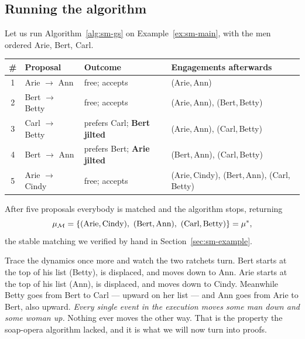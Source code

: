 \subsection{Running the algorithm}\label{sec:sm-trace}

Let us run Algorithm~\ref{alg:sm-gs} on Example~\ref{ex:sm-main}, with the men
ordered Arie, Bert, Carl.

\begin{center}
\small
\begin{tabular}{@{}clll@{}}
\toprule
\# & Proposal & Outcome & Engagements afterwards \\
\midrule
1 & Arie $\to$ Ann   & free; accepts
  & (Arie,\,Ann) \\
2 & Bert $\to$ Betty & free; accepts
  & (Arie,\,Ann), (Bert,\,Betty) \\
3 & Carl $\to$ Betty & prefers Carl; \textbf{Bert jilted}
  & (Arie,\,Ann), (Carl,\,Betty) \\
4 & Bert $\to$ Ann   & prefers Bert; \textbf{Arie jilted}
  & (Bert,\,Ann), (Carl,\,Betty) \\
5 & Arie $\to$ Cindy & free; accepts
  & (Arie,\,Cindy), (Bert,\,Ann), (Carl,\,Betty) \\
\bottomrule
\end{tabular}
\end{center}

After five proposals everybody is matched and the algorithm stops, returning
\[
  \mu_{\mathcal{M}} =
  \{(\text{Arie},\text{Cindy}),\ (\text{Bert},\text{Ann}),\
    (\text{Carl},\text{Betty})\} = \mu^{*},
\]
the stable matching we verified by hand in Section~\ref{sec:sm-example}.

Trace the dynamics once more and watch the two ratchets turn. Bert starts at
the top of his list (Betty), is displaced, and moves down to Ann. Arie starts
at the top of his list (Ann), is displaced, and moves down to Cindy. Meanwhile
Betty goes from Bert to Carl --- upward on her list --- and Ann goes from Arie
to Bert, also upward. \emph{Every single event in the execution moves some man
down and some woman up.} Nothing ever moves the other way. That is the
property the soap-opera algorithm lacked, and it is what we will now turn into
proofs.

